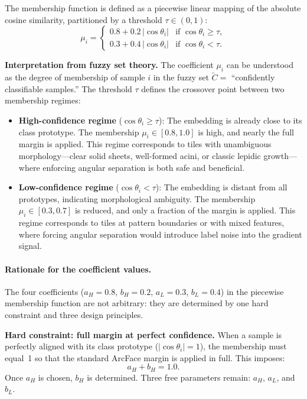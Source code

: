 The membership function is defined as a piecewise linear mapping of the absolute cosine similarity, partitioned by a threshold $\tau \in (0, 1)$:
\begin{equation}
\label{eq:membership_v2}
\mu_i = \begin{cases}
0.8 + 0.2\,|\cos\theta_i| & \text{if } \cos\theta_i \geq \tau, \\[4pt]
0.3 + 0.4\,|\cos\theta_i| & \text{if } \cos\theta_i < \tau.
\end{cases}
\end{equation}

\textbf{Interpretation from fuzzy set theory.}
The coefficient $\mu_i$ can be understood as the degree of membership of sample $i$ in the fuzzy set $\tilde{C} = $ ``confidently classifiable samples.''
The threshold $\tau$ defines the crossover point between two membership regimes:

\begin{itemize}
    \item \textbf{High-confidence regime} ($\cos\theta_i \geq \tau$): The embedding is already close to its class prototype. The membership $\mu_i \in [0.8, 1.0]$ is high, and nearly the full margin is applied. This regime corresponds to tiles with unambiguous morphology---clear solid sheets, well-formed acini, or classic lepidic growth---where enforcing angular separation is both safe and beneficial.

    \item \textbf{Low-confidence regime} ($\cos\theta_i < \tau$): The embedding is distant from all prototypes, indicating morphological ambiguity. The membership $\mu_i \in [0.3, 0.7]$ is reduced, and only a fraction of the margin is applied. This regime corresponds to tiles at pattern boundaries or with mixed features, where forcing angular separation would introduce label noise into the gradient signal.
\end{itemize}

\paragraph{Rationale for the coefficient values.}
The four coefficients ($a_H = 0.8$, $b_H = 0.2$, $a_L = 0.3$,
$b_L = 0.4$) in the piecewise membership function are not arbitrary:
they are determined by one hard constraint and three design
principles.

\textbf{Hard constraint: full margin at perfect confidence.}
When a sample is perfectly aligned with its class prototype
($|\cos\theta_i| = 1$), the membership must equal~1 so that the
standard ArcFace margin is applied in full.
This imposes:
\begin{equation}
\label{eq:coeff_constraint}
a_H + b_H = 1.0.
\end{equation}
Once $a_H$ is chosen, $b_H$ is determined.
Three free parameters remain: $a_H$, $a_L$, and $b_L$.

